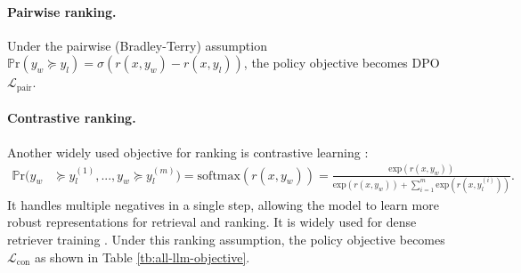\paragraph{Pairwise ranking.} 
Under the pairwise (Bradley-Terry) assumption $ \mathbb{P}\text{r}(y_w \succeq y_l) = \sigma(r(x,y_w) - r(x,y_l))$,
the policy objective becomes DPO \citep{rafailov2024direct} $\mathcal{L}_{\text{pair}}$.

\paragraph{Contrastive ranking.} Another widely used objective for ranking is contrastive learning \citep{oord2018representation}:
\begin{equation}\label{eq:contrastive-assumption}
\begin{aligned}
\mathbb{P}\text{r}(y_w & \succeq y^{(1)}_l, ..., y_w \succeq y^{(m)}_l) 
= \text{softmax}(r(x, y_w)) = \frac{\text{exp}(r(x,y_w))}{\text{exp}(r(x,y_w)) + \sum^m_{i=1}\text{exp}(r(x,y^{(i)}_l))}.
\end{aligned}
\end{equation}
It handles multiple negatives in a single step, allowing the model to learn more robust representations for retrieval and ranking.
It is widely used for dense retriever training \citep{karpukhin2020dense}.
Under this ranking assumption, the policy objective becomes $\mathcal{L}_{\text{con}}$ as shown in Table \ref{tb:all-llm-objective}.

